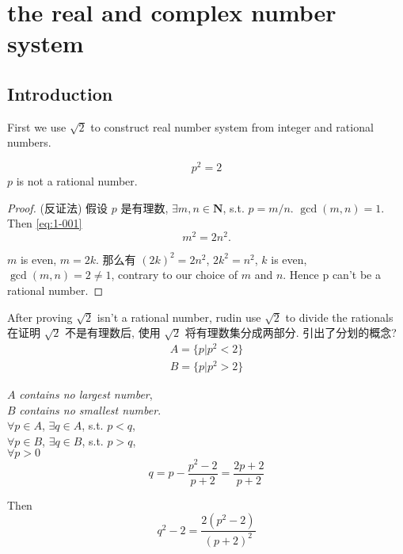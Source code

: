 \chapter{the real and complex number system}

\section{Introduction}
First we use $\sqrt{2}$ to construct real number system from integer and rational numbers.

\begin{Example}
\begin{equation}\label{eq:1-001}
    p^2=2
\end{equation}
$p$ is not a rational number.
\end{Example}

\begin{proof}
(反证法) 假设 $p$ 是有理数,  $\exists m,n \in \mathbf{N}$, s.t. $p=m/n$. $\gcd (m,n) = 1$.
Then \ref{eq:1-001}
\begin{equation}\label{eq:1-002}
    m^2 = 2n^2.
\end{equation}

$m$ is even, $m = 2k$.
那么有 $(2k)^2 = 2n^2$, $2k^2 = n^2$, $k$ is even, $\gcd (m,n)=2\neq 1$,
contrary to our choice of $m$ and $n$. Hence p can't be a rational number.
\end{proof}

After proving $\sqrt{2}$ isn't a rational number, rudin use $\sqrt{2}$ to divide the rationals
在证明 $\sqrt{2}$ 不是有理数后, 使用 $\sqrt{2}$ 将有理数集分成两部分.  引出了分划的概念? 
\begin{align*}
    A = \{p|p^2<2\}\\
    B = \{p|p^2>2\}
\end{align*}

$A$ \emph{contains no largest number},\\
$B$ \emph{contains no smallest number}.\\
$\forall p\in A$, $\exists q\in A$, s.t. $p<q$,\\
$\forall p\in B$, $\exists q\in B$, s.t. $p>q$,\\
$\forall p>0$
\begin{equation}\label{eq:1-003}
    q = p-\frac{p^2-2}{p+2} = \frac{2p+2}{p+2}
\end{equation}

Then 
\begin{equation}
    \label{eq:1-004}
    q^2 - 2 = \frac{2(p^2-2)}{(p+2)^2}
\end{equation}

